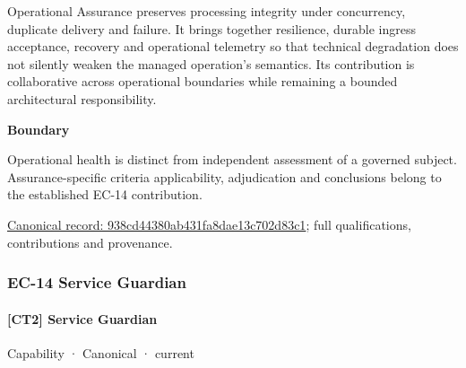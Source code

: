 Operational Assurance preserves processing integrity under concurrency, duplicate delivery and failure. It brings together resilience, durable ingress acceptance, recovery and operational telemetry so that technical degradation does not silently weaken the managed operation's semantics. Its contribution is collaborative across operational boundaries while remaining a bounded architectural responsibility.



\textbf{Boundary}



Operational health is distinct from independent assessment of a governed subject. Assurance-specific criteria applicability, adjudication and conclusions belong to the established EC-14 contribution.


{\footnotesize \href{../../../../continuum/strategy/capability/938cd44380ab431fa8dae13c702d83c1.md}{Canonical record: 938cd44380ab431fa8dae13c702d83c1}; full qualifications, contributions and provenance.}\par
\subsubsection{EC-14 Service Guardian}

\paragraph{[CT2] Service Guardian}

\label{element:d767f12f9b1c495883216ace464ee1c2}
{\small Capability · Canonical · current}\par

